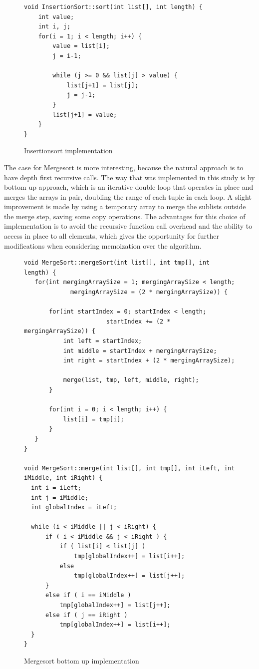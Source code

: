 \documentclass[a4paper,12pt]{article}
\begin{document}
\begin{figure}[H]
\begin{small}
\begin{verbatim}
void InsertionSort::sort(int list[], int length) {
	int value;
	int i, j;
	for(i = 1; i < length; i++) {
	    value = list[i];
	    j = i-1;

	    while (j >= 0 && list[j] > value) {
	        list[j+1] = list[j];
	        j = j-1;
	    }
	    list[j+1] = value;
	}
}
\end{verbatim}
\end{small}
\caption{Insertionsort implementation}
\end{figure}


The case for Mergesort is more interesting, because the natural approach is to have depth first  recursive calls. The way that was implemented in this study is by bottom up approach, which is an iterative double loop that operates in place and merges the arrays in pair, doubling the range of each tuple in each loop. A slight improvement is made by using a temporary array to merge the sublists outside the merge step, saving some copy operations. The advantages for this choice of implementation is to avoid the recursive function call overhead and the ability to access in place to all elements, which gives the opportunity for further modifications when considering memoization over the algorithm.

\begin{figure}[H]
\begin{small}
\begin{verbatim}
void MergeSort::mergeSort(int list[], int tmp[], int length) {
   for(int mergingArraySize = 1; mergingArraySize < length;
   			 mergingArraySize = (2 * mergingArraySize)) { 

       for(int startIndex = 0; startIndex < length; 
       				   startIndex += (2 * mergingArraySize)) {
           int left = startIndex;
           int middle = startIndex + mergingArraySize;
           int right = startIndex + (2 * mergingArraySize);

           merge(list, tmp, left, middle, right);
       }
       
       for(int i = 0; i < length; i++) {
           list[i] = tmp[i];
       }
   }
}

void MergeSort::merge(int list[], int tmp[], int iLeft, int iMiddle, int iRight) {
  int i = iLeft;
  int j = iMiddle;
  int globalIndex = iLeft;

  while (i < iMiddle || j < iRight) {
      if ( i < iMiddle && j < iRight ) {
          if ( list[i] < list[j] )
              tmp[globalIndex++] = list[i++];
          else
              tmp[globalIndex++] = list[j++];
      }
      else if ( i == iMiddle )
          tmp[globalIndex++] = list[j++];
      else if ( j == iRight )
          tmp[globalIndex++] = list[i++];
  }
}
\end{verbatim}
\end{small}
\caption{Mergesort bottom up implementation}
\end{figure}
\end{document}
